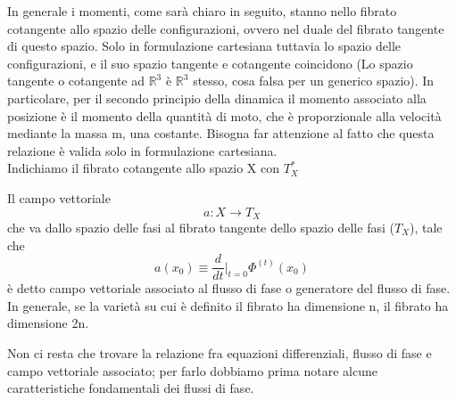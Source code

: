 \documentclass[
10pt, %
a4paper, %
oneside, %
headinclude,footinclude, %
BCOR5mm, %
]{scrartcl}
\begin{document}
\begin{osservazione}
	In generale i momenti, come sarà chiaro in seguito, stanno nello fibrato cotangente allo spazio delle configurazioni, ovvero nel duale del fibrato tangente di questo spazio. Solo in formulazione cartesiana tuttavia lo spazio delle configurazioni, e il suo spazio tangente e cotangente coincidono (Lo spazio tangente o cotangente ad \(\mathbb{R}^3\) è \(\mathbb{R}^3\) stesso, cosa falsa per un generico spazio). In particolare, per il secondo principio della dinamica il momento associato alla posizione è il momento della quantità di moto, che è proporzionale alla velocità mediante la massa m, una costante. Bisogna far attenzione al fatto che questa relazione è valida solo in formulazione cartesiana.\\
	Indichiamo il fibrato cotangente allo spazio X con \(T^*_X\)
\end{osservazione}
\begin{definizione}
	Il campo vettoriale
	\[a: X\rightarrow T_{X}\]
	che va dallo spazio delle fasi al fibrato tangente dello spazio delle fasi (\(T_{X}\)), tale che
	\[a(x_0)\equiv\frac{d}{dt}|_{t=0}\Phi^{(t)}(x_0) \]
	è detto campo vettoriale associato al flusso di fase o generatore del flusso di fase. In generale, se la varietà su cui è definito il fibrato ha dimensione n, il fibrato ha dimensione 2n. 
\end{definizione}
Non ci resta che trovare la relazione fra equazioni differenziali, flusso di fase e campo vettoriale associato; per farlo dobbiamo prima notare alcune caratteristiche fondamentali dei flussi di fase.
\end{document}
